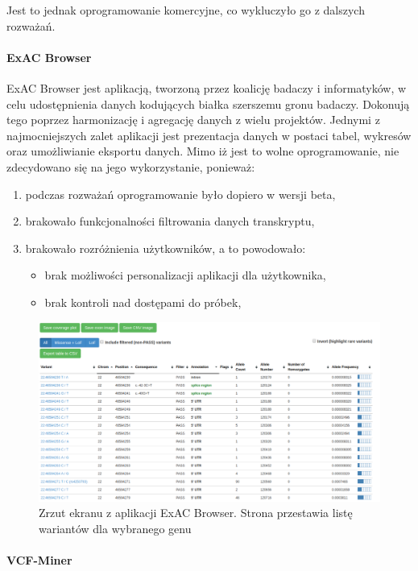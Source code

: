 \documentclass[a4paper,12pt,twoside]{article}
\begin{document}
Jest to jednak oprogramowanie komercyjne, co wykluczyło go z dalszych
rozważań.

\paragraph{ExAC Browser} ExAC Browser jest aplikacją, tworzoną przez koalicję badaczy i informatyków, w celu
udostępnienia danych kodujących białka szerszemu gronu badaczy.
Dokonują tego poprzez harmonizację i agregację danych z wielu projektów.
Jednymi z najmocniejszych zalet aplikacji jest prezentacja danych w postaci tabel, wykresów oraz umożliwianie eksportu danych.
Mimo iż jest to wolne oprogramowanie, nie zdecydowano się na jego wykorzystanie, ponieważ:
\begin{enumerate}[1)]
\item podczas rozważań oprogramowanie było dopiero w wersji beta,
\item brakowało funkcjonalności filtrowania danych transkryptu,
\item brakowało rozróżnienia użytkowników, a to powodowało:
\begin{itemize}
\item brak możliwości personalizacji aplikacji dla użytkownika,
\item brak kontroli nad dostępami do próbek,
\end{itemize}
\end{enumerate}

\begin{figure}[h]
\includegraphics[width=\linewidth]{obrazy/exac/broad.png}
\caption{Zrzut ekranu z aplikacji ExAC Browser. Strona przestawia listę wariantów dla wybranego genu}
\label{fig:broadpic}
\end{figure}

\newpage

\paragraph{VCF-Miner}
\end{document}
